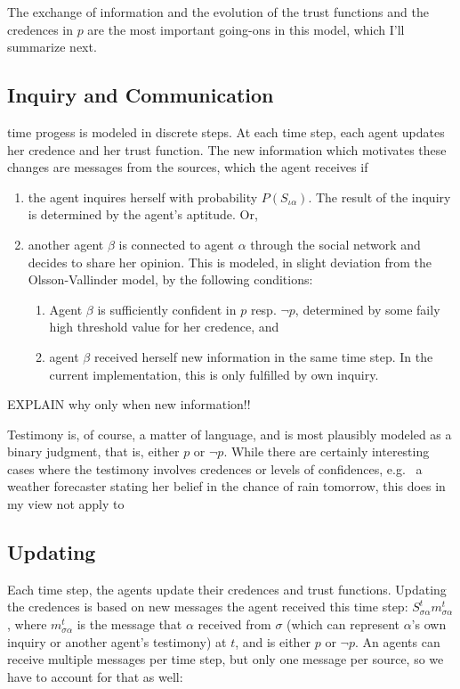 \documentclass[11pt, a4paper]{article}
\newcommand{\Stsa}{S^t_{\sigma\alpha}}
\newcommand{\sa}{{\sigma\alpha}}
\begin{document}
The exchange of information and the evolution of the trust functions and the credences in $p$ are the most important going-ons in this model, which I'll summarize next.

\subsection{Inquiry and Communication} 

time progess is modeled in discrete steps. At each time step, each agent updates her credence and her trust function. The new information which motivates these changes are messages from the sources, which the agent receives if
\begin{enumerate}[label = (\roman*)]
    \item the agent inquires herself with probability $P(S_{\iota\alpha})$. The result of the inquiry is determined by the agent's aptitude. Or,
    \item another agent $\beta$ is connected to agent $\alpha$ through the social network and decides to share her opinion. This is modeled, in slight deviation from the Olsson-Vallinder model, by the following conditions: 
        \begin{enumerate}[label = (\alph*)]
            \item Agent $\beta$ is sufficiently confident in $p$ resp. $\neg p$, determined by some faily high threshold value for her credence, and
            \item agent $\beta$ received herself new information in the same time step. In the current implementation, this is only fulfilled by own inquiry.  
        \end{enumerate}
\end{enumerate}

EXPLAIN why only when new information!!

Testimony is, of course, a matter of language, and is most plausibly modeled as a binary judgment, that is, either $p$ or $\neg p$. While there are certainly interesting cases where the testimony involves credences or levels of confidences, e.g. \ a weather forecaster stating her belief in the chance of rain tomorrow, this does in my view not apply to  

\subsection{Updating}

Each time step, the agents update their credences and trust functions. Updating the credences is based on new messages the agent received this time step: $\Stsa m^t_{\sa}$, where $m^t_{\sa}$ is the message that $\alpha$ received from $\sigma$ (which can represent $\alpha$'s own inquiry or another agent's testimony) at $t$, and is either $p$ or $\neg p$. An agents can receive multiple messages per time step, but only one message per source, so we have to account for that as well: 
\end{document}
